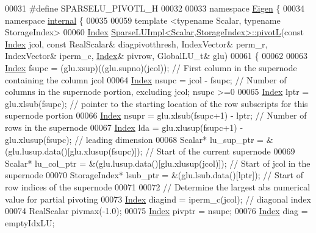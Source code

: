 \begin{DoxyCode}
00031 \textcolor{preprocessor}{#define SPARSELU\_PIVOTL\_H}
00032 
00033 \textcolor{keyword}{namespace }\hyperlink{namespace_eigen}{Eigen} \{
00034 \textcolor{keyword}{namespace }\hyperlink{namespaceinternal}{internal} \{
00035   
00059 \textcolor{keyword}{template} <\textcolor{keyword}{typename} Scalar, \textcolor{keyword}{typename} StorageIndex>
00060 \hyperlink{namespace_eigen_a62e77e0933482dafde8fe197d9a2cfde}{Index} \hyperlink{group___sparse_l_u___module_ab5f56947465b829f8d523575724c3ac6}{SparseLUImpl<Scalar,StorageIndex>::pivotL}(\textcolor{keyword}{const} 
      \hyperlink{namespace_eigen_a62e77e0933482dafde8fe197d9a2cfde}{Index} jcol, \textcolor{keyword}{const} RealScalar& diagpivotthresh, IndexVector& perm\_r, IndexVector& iperm\_c, 
      \hyperlink{namespace_eigen_a62e77e0933482dafde8fe197d9a2cfde}{Index}& pivrow, GlobalLU\_t& glu)
00061 \{
00062   
00063   \hyperlink{namespace_eigen_a62e77e0933482dafde8fe197d9a2cfde}{Index} fsupc = (glu.xsup)((glu.supno)(jcol)); \textcolor{comment}{// First column in the supernode containing the column
       jcol}
00064   \hyperlink{namespace_eigen_a62e77e0933482dafde8fe197d9a2cfde}{Index} nsupc = jcol - fsupc; \textcolor{comment}{// Number of columns in the supernode portion, excluding jcol; nsupc >=0}
00065   \hyperlink{namespace_eigen_a62e77e0933482dafde8fe197d9a2cfde}{Index} lptr = glu.xlsub(fsupc); \textcolor{comment}{// pointer to the starting location of the row subscripts for this
       supernode portion}
00066   \hyperlink{namespace_eigen_a62e77e0933482dafde8fe197d9a2cfde}{Index} nsupr = glu.xlsub(fsupc+1) - lptr; \textcolor{comment}{// Number of rows in the supernode}
00067   \hyperlink{namespace_eigen_a62e77e0933482dafde8fe197d9a2cfde}{Index} lda = glu.xlusup(fsupc+1) - glu.xlusup(fsupc); \textcolor{comment}{// leading dimension}
00068   Scalar* lu\_sup\_ptr = &(glu.lusup.data()[glu.xlusup(fsupc)]); \textcolor{comment}{// Start of the current supernode}
00069   Scalar* lu\_col\_ptr = &(glu.lusup.data()[glu.xlusup(jcol)]); \textcolor{comment}{// Start of jcol in the supernode}
00070   StorageIndex* lsub\_ptr = &(glu.lsub.data()[lptr]); \textcolor{comment}{// Start of row indices of the supernode}
00071   
00072   \textcolor{comment}{// Determine the largest abs numerical value for partial pivoting }
00073   \hyperlink{namespace_eigen_a62e77e0933482dafde8fe197d9a2cfde}{Index} diagind = iperm\_c(jcol); \textcolor{comment}{// diagonal index }
00074   RealScalar pivmax(-1.0);
00075   \hyperlink{namespace_eigen_a62e77e0933482dafde8fe197d9a2cfde}{Index} pivptr = nsupc; 
00076   \hyperlink{namespace_eigen_a62e77e0933482dafde8fe197d9a2cfde}{Index} diag = emptyIdxLU; 

\end{DoxyCode}
